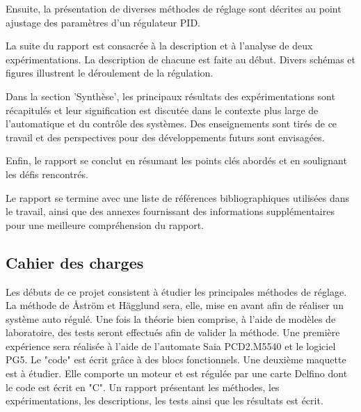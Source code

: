 Ensuite, la présentation de diverses méthodes de réglage sont décrites au point ajustage des paramètres d'un régulateur PID.

La suite du rapport est consacrée à la description et à l'analyse de deux expérimentations. La description de chacune est faite au début. Divers schémas et figures illustrent le déroulement de la régulation.

Dans la section 'Synthèse', les principaux résultats des expérimentations sont récapitulés et leur signification est discutée dans le contexte plus large de l'automatique et du contrôle des systèmes. Des enseignements sont tirés de ce travail et des perspectives pour des développements futurs sont envisagées.

Enfin, le rapport se conclut en résumant les points clés abordés et en soulignant les défis rencontrés. 

Le rapport se termine avec une liste de références bibliographiques utilisées dans le travail, ainsi que des annexes fournissant des informations supplémentaires pour une meilleure compréhension du rapport.
\subsection{Cahier des charges}

Les débuts de ce projet consistent à étudier les principales méthodes de réglage. La méthode de Åström et Hägglund sera, elle, mise en avant afin de réaliser un système auto régulé. Une fois la théorie bien comprise, à l'aide de modèles de laboratoire, des tests seront effectués afin de valider la méthode. Une première expérience sera réalisée à l'aide de l'automate Saia PCD2.M5540 et le logiciel PG5. Le "code" est écrit grâce à des blocs fonctionnels. Une deuxième maquette est à étudier. Elle comporte un moteur et est régulée par une carte Delfino dont le code est écrit en "C". Un rapport présentant les méthodes, les expérimentations, les descriptions, les tests ainsi que les résultats est écrit.



